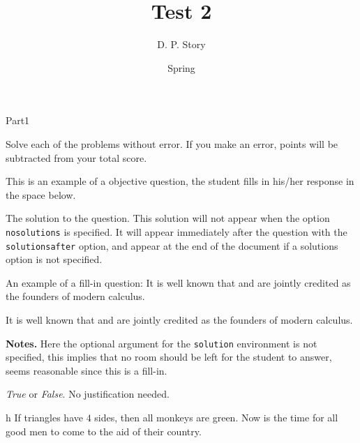 \documentclass[10pt]{article}
\title[T2]{Test 2}
\author{D. P. Story}
\date{Spring \the\year}
\begin{document}
\maketitle

\begin{exam}[Part I.]{Part1}

\begin{instructions}[Part I.]
Solve each of the problems without error. If you make an error,
points will be subtracted from your total score.
\end{instructions}


\begin{problem}[5]
This is an example of a objective question, the student fills in his/her response
in the space below.

\begin{solution}[.5in]
The solution to the question. This solution will not appear when
the option \texttt{nosolutions} is specified. It will appear
immediately after the question with the \texttt{solutionsafter}
option, and appear at the end of the document if a solutions
option is not specified.
\end{solution}
\end{problem}


\begin{problem}[5]
An example of a fill-in question:
It is well known that  and
 are jointly credited as the founders of
modern calculus.

\begin{solution}
It is well known that  and  are
jointly credited as the founders of modern calculus.

\medskip\noindent\textbf{Notes.} Here the optional argument for
the \texttt{solution} environment is not specified, this implies
that no room should be left for the student to answer, seems
reasonable since this is a fill-in.
\end{solution}
\end{problem}

\begin{problem*}[3ea]
\textit{True} or \textit{False}.  No justification needed.

\fillinWidth{}

\begin{parts}

    \item[h]  If triangles have $4$ sides, then all monkeys
    are green. Now is the time for all good men to come to the aid
    of their country.


\end{parts}
\end{problem*}
\end{exam}
\end{document}
